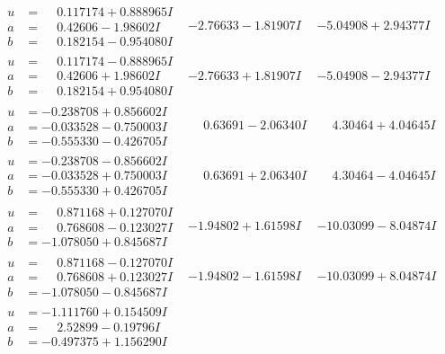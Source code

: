 \documentclass[1p]{elsarticle_modified}
\theoremstyle{definition}
\begin{document}
$$\begin{array}{c|c|c}
\begin{aligned}
u &= \phantom{-}0.117174 + 0.888965 I \\
a &= \phantom{-}0.42606 - 1.98602 I \\
b &= \phantom{-}0.182154 - 0.954080 I\end{aligned}
 & -2.76633 - 1.81907 I & -5.04908 + 2.94377 I \\ \hline\begin{aligned}
u &= \phantom{-}0.117174 - 0.888965 I \\
a &= \phantom{-}0.42606 + 1.98602 I \\
b &= \phantom{-}0.182154 + 0.954080 I\end{aligned}
 & -2.76633 + 1.81907 I & -5.04908 - 2.94377 I \\ \hline\begin{aligned}
u &= -0.238708 + 0.856602 I \\
a &= -0.033528 - 0.750003 I \\
b &= -0.555330 - 0.426705 I\end{aligned}
 & \phantom{-}0.63691 - 2.06340 I & \phantom{-}4.30464 + 4.04645 I \\ \hline\begin{aligned}
u &= -0.238708 - 0.856602 I \\
a &= -0.033528 + 0.750003 I \\
b &= -0.555330 + 0.426705 I\end{aligned}
 & \phantom{-}0.63691 + 2.06340 I & \phantom{-}4.30464 - 4.04645 I \\ \hline\begin{aligned}
u &= \phantom{-}0.871168 + 0.127070 I \\
a &= \phantom{-}0.768608 - 0.123027 I \\
b &= -1.078050 + 0.845687 I\end{aligned}
 & -1.94802 + 1.61598 I & -10.03099 - 8.04874 I \\ \hline\begin{aligned}
u &= \phantom{-}0.871168 - 0.127070 I \\
a &= \phantom{-}0.768608 + 0.123027 I \\
b &= -1.078050 - 0.845687 I\end{aligned}
 & -1.94802 - 1.61598 I & -10.03099 + 8.04874 I \\ \hline\begin{aligned}
u &= -1.111760 + 0.154509 I \\
a &= \phantom{-}2.52899 - 0.19796 I \\
b &= -0.497375 + 1.156290 I\end{aligned}

\end{array}$$
\end{document}
